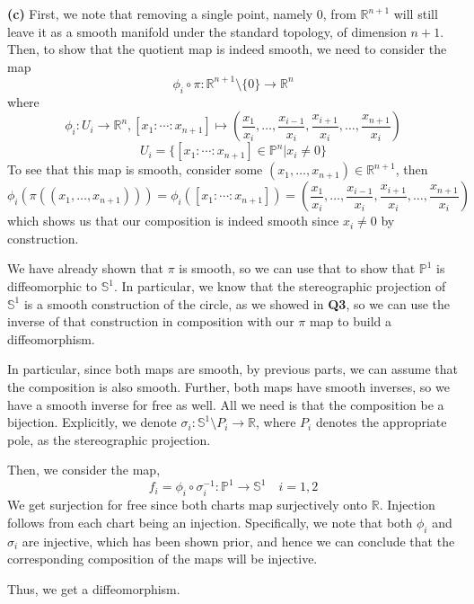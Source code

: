 \documentclass[10pt]{article}
\newcommand{\R}{\mathbb{R}}
\newcommand{\Sp}{\mathbb{S}}
\newcommand{\Pro}{\mathbb{P}}
\begin{document}
\textbf{(c)} First, we note that removing a single point, namely $0$, from $\R^{n+1}$ will still leave it as a smooth manifold under the standard topology, of dimension $n+1$. Then, to show that the quotient map is indeed smooth, we need to consider the map
$$\phi_{i} \circ \pi :\R^{n+1}\setminus \{0\} \to \R^{n}$$
where
$$\phi_{i}: U_{i} \to \R^{n}, [x_{1}:\cdots:x_{n+1}]\mapsto \left(\frac{x_{1}}{x_{i}},\dots,\frac{x_{i-1}}{x_{i}},\frac{x_{i+1}}{x_{i}},\dots,\frac{x_{n+1}}{x_{i}}\right)$$
$$U_{i} = \{[x_{1}:\cdots:x_{n+1}]\in \Pro^{n}| x_{i}\neq 0\}$$
To see that this map is smooth, consider some $(x_{1},\dots,x_{n+1})\in \R^{n+1}$, then
$$\phi_{i}\left(\pi\left((x_{1},\dots,x_{n+1})\right)\right) = \phi_{i}\left([x_{1}:\cdots:x_{n+1}]\right) = \left(\frac{x_{1}}{x_{i}},\dots,\frac{x_{i-1}}{x_{i}},\frac{x_{i+1}}{x_{i}},\dots,\frac{x_{n+1}}{x_{i}}\right)$$
which shows us that our composition is indeed smooth since $x_{i}\neq 0$ by construction.

We have already shown that $\pi$ is smooth, so we can use that to show that $\Pro^{1}$ is diffeomorphic to $\Sp^{1}$. In particular, we know that the stereographic projection of $\Sp^{1}$ is a smooth construction of the circle, as we showed in \textbf{Q3}, so we can use the inverse of that construction in composition with our $\pi$ map to build a diffeomorphism.

In particular, since both maps are smooth, by previous parts, we can assume that the composition is also smooth. Further, both maps have smooth inverses, so we have a smooth inverse for free as well. All we need is that the composition be a bijection. Explicitly, we denote $\sigma_{i}: \Sp^{1}\setminus P_{i}\to \R$, where $P_{i}$ denotes the appropriate pole, as the stereographic projection. 

Then, we consider the map,
$$f_{i} = \phi_{i}\circ \sigma_{i}^{-1}: \Pro^{1} \to \Sp^{1} \hspace{1em} i=1,2$$
We get surjection for free since both charts map surjectively onto $\R$. Injection follows from each chart being an injection. Specifically, we note that both $\phi_{i}$ and $\sigma_{i}$ are injective, which has been shown prior, and hence we can conclude that the corresponding composition of the maps will be injective.

Thus, we get a diffeomorphism.
\end{document}
